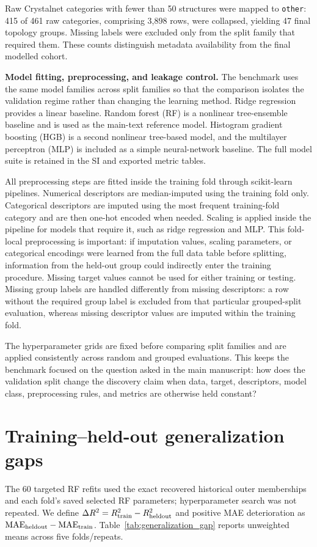 \documentclass[11pt,a4paper]{article}
\begin{document}
Raw Crystalnet categories with fewer than 50 structures were mapped to \texttt{other}: 415 of 461 raw categories, comprising 3,898 rows, were collapsed, yielding 47 final topology groups. Missing labels were excluded only from the split family that required them. These counts distinguish metadata availability from the final modelled cohort.





\noindent\textbf{Model fitting, preprocessing, and leakage control.}
The benchmark uses the same model families across split families so that the comparison isolates the validation regime rather than changing the learning method. Ridge regression provides a linear baseline. Random forest (RF) is a nonlinear tree-ensemble baseline and is used as the main-text reference model. Histogram gradient boosting (HGB) is a second nonlinear tree-based model, and the multilayer perceptron (MLP) is included as a simple neural-network baseline. The full model suite is retained in the SI and exported metric tables.

All preprocessing steps are fitted inside the training fold through scikit-learn pipelines. Numerical descriptors are median-imputed using the training fold only. Categorical descriptors are imputed using the most frequent training-fold category and are then one-hot encoded when needed. Scaling is applied inside the pipeline for models that require it, such as ridge regression and MLP. This fold-local preprocessing is important: if imputation values, scaling parameters, or categorical encodings were learned from the full data table before splitting, information from the held-out group could indirectly enter the training procedure. Missing target values cannot be used for either training or testing. Missing group labels are handled differently from missing descriptors: a row without the required group label is excluded from that particular grouped-split evaluation, whereas missing descriptor values are imputed within the training fold.

The hyperparameter grids are fixed before comparing split families and are applied consistently across random and grouped evaluations. This keeps the benchmark focused on the question asked in the main manuscript: how does the validation split change the discovery claim when data, target, descriptors, model class, preprocessing rules, and metrics are otherwise held constant?

\section{Training--held-out generalization gaps}
The 60 targeted RF refits used the exact recovered historical outer memberships and each fold's saved selected RF parameters; hyperparameter search was not repeated. We define $\Delta R^2=R^2_{\rm train}-R^2_{\rm heldout}$ and positive MAE deterioration as $\mathrm{MAE}_{\rm heldout}-\mathrm{MAE}_{\rm train}$. Table~\ref{tab:generalization_gap} reports unweighted means across five folds/repeats.
\end{document}
